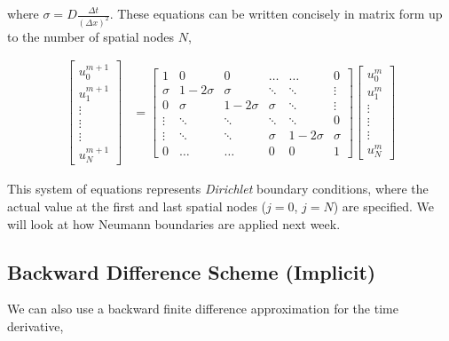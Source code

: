 \documentclass[12pt]{article}
\begin{document}
\vspace{4mm}

where $\sigma = D\frac{\Delta t}{(\Delta x)^2}$. These equations can be written concisely in matrix form up to the number of spatial nodes $N$,

\begin{align*}
\begin{bmatrix}
	u_0^{m+1} \\[1ex]
	u_1^{m+1} \\[1ex]
	\vdots \\[1ex]
	\vdots \\[1ex]
	\vdots \\[1ex]
	u_N^{m+1}
\end{bmatrix} 
&=
\begin{bmatrix}
  	1 & 0 & 0 & \dots & \dots & 0 \\[1ex]
    \sigma & 1-2\sigma & \sigma & \ddots & \ddots & \vdots  \\[1ex]
    0 & \sigma & 1-2\sigma & \sigma & \ddots & \vdots \\[1ex]
    \vdots & \ddots & \ddots & \ddots & \ddots & 0 \\[1ex]
    \vdots & \ddots & \ddots & \sigma & 1-2\sigma & \sigma \\[1ex]
    0 & \dots & \dots & 0 & 0 & 1
\end{bmatrix}
\begin{bmatrix}
	u_0^{m} \\[1.2ex]
	u_1^{m} \\[1.2ex]
	\vdots \\[1.2ex]
	\vdots \\[1.2ex]
	\vdots \\[1.2ex]
	u_N^{m}
\end{bmatrix} 
\end{align*}

\vspace{4mm}

This system of equations represents {\it Dirichlet} boundary conditions, where the actual value at the first and last spatial nodes ($j=0$, $j=N$) are specified. We will look at how Neumann boundaries are applied next week.


\subsection{Backward Difference Scheme (Implicit)}

We can also use a backward finite difference approximation for the time derivative,
\end{document}
